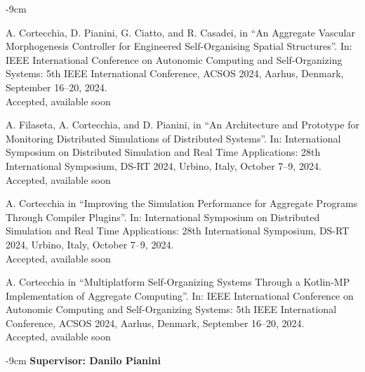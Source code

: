 \documentclass[10pt,a4paper]{altacv}
\begin{document}
\begin{adjustwidth}{}{-9cm}

    A. Cortecchia, D. Pianini, G. Ciatto, and R. Casadei, in
    ``An Aggregate Vascular Morphogenesis Controller for Engineered Self-Organising Spatial Structures''.
    In: IEEE International Conference on Autonomic Computing and Self-Organizing Systems: 5th IEEE International Conference, ACSOS 2024, Aarhus, Denmark, September 16–20, 2024.\\
    {\small \notesymbol \hspace{0.5em} Accepted, available soon}\\

    \divider

    A. Filaseta, A. Cortecchia, and D. Pianini, in
    ``An Architecture and Prototype for Monitoring Distributed Simulations of Distributed Systems''.
    In: International Symposium on Distributed Simulation and Real Time Applications: 28th International Symposium, DS-RT 2024, Urbino, Italy, October 7–9, 2024.\\
    {\small \notesymbol \hspace{0.5em} Accepted, available soon}\\

    \divider

    A. Cortecchia in
    ``Improving the Simulation Performance for Aggregate Programs Through Compiler Plugins''.
    In: International Symposium on Distributed Simulation and Real Time Applications: 28th International Symposium, DS-RT 2024, Urbino, Italy, October 7–9, 2024.\\
    {\small \notesymbol \hspace{0.5em} Accepted, available soon}\\

    \divider

    A. Cortecchia in
    ``Multiplatform Self-Organizing Systems Through a Kotlin-MP Implementation of Aggregate Computing''.
    In: IEEE International Conference on Autonomic Computing and Self-Organizing Systems: 5th IEEE International Conference, ACSOS 2024, Aarhus, Denmark, September 16–20, 2024.\\
    {\small \notesymbol \hspace{0.5em} Accepted, available soon}\\

\end{adjustwidth}

\begin{adjustwidth}{}{-9cm}
    \textbf{Supervisor: Danilo Pianini}

    \divider

\end{adjustwidth}
\end{document}
